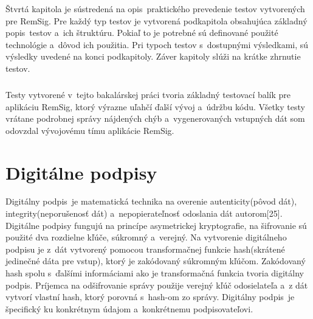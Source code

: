 \documentclass[
  digital, %
  table,   %
oneside,
  nolof,     %
  nolot,     %
]{fithesis3}
\begin{document}
Štvrtá kapitola je sústredená na opis~praktického prevedenie  testov vytvorených pre RemSig. Pre každý typ testov je vytvorená podkapitola obsahujúca základný popis~testov a~ich štruktúru. Pokiaľ to je potrebné sú definované použité technológie a~dôvod ich použitia. Pri typoch testov s~dostupnými výsledkami, sú výsledky uvedené na konci podkapitoly. Záver kapitoly slúži na krátke zhrnutie testov.\paragraph{}
Testy vytvorené v~tejto bakalárskej práci tvoria základný testovací balík pre aplikáciu RemSig, ktorý výrazne uľahčí ďalší vývoj a~údržbu kódu. Všetky testy vrátane podrobnej správy nájdených chýb a~vygenerovaných vstupných dát som odovzdal vývojovému tímu aplikácie RemSig.
\chapter{Digitálne podpisy}
Digitálny podpis~je matematická technika na overenie autenticity(pôvod dát), integrity(neporušenosť dát) a~nepopierateľnosť odoslania dát autorom[25].  Digitálne podpisy fungujú na princípe asymetrickej kryptografie, na šifrovanie sú použité dva rozdielne kľúče, súkromný a~verejný. Na vytvorenie digitálneho podpisu je z~dát vytvorený pomocou transformačnej funkcie  hash(skrátené jedinečné dáta pre vstup), ktorý je zakódovaný súkromným kľúčom. Zakódovaný hash spolu s~ďalšími informáciami ako je transformačná funkcia  tvoria digitálny podpis. Príjemca na odšifrovanie  správy použije verejný kľúč odosielateľa a~z dát vytvorí vlastní hash, ktorý porovná s~hash-om zo správy.  Digitálny podpis~je špecifický ku konkrétnym údajom a~konkrétnemu podpisovateľovi.
\end{document}
